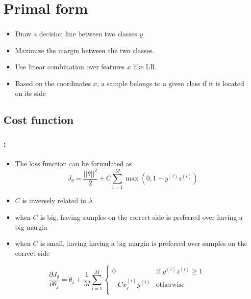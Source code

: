 \documentclass[xcolor=table]{beamer}
\begin{document}
\section{Primal form}

\begin{frame}
	\frametitle{\insertshortsubtitle}
	\framesubtitle{\insertsection}
	
	\begin{minipage}{0.70\textwidth} 
		\begin{itemize}
			\item Draw a decision line between two classes $ y $ 
			\item Maximize the margin between the two classes.
			\item Use linear combination over features $ x $ like LR. 
			\item Based on the coordinates $ x $, a sample belongs to a given class if it is located on its side
		\end{itemize}
	\end{minipage}
	\begin{minipage}{0.29\textwidth} 
	\end{minipage}
	

\end{frame}

\subsection{Cost function}

\begin{frame}
	\frametitle{\insertshortsubtitle: \insertsection}
	\framesubtitle{\insertsubsection}
	
	\begin{itemize}
		\item The loss function can be formulated as 
		\[J_\theta = \frac{||\theta||^2}{2}  +  C \sum_{i=1}^{M} \max (0, 1 - y^{(i)} z^{(i)}) \]
		\item $ C $ is inversely related to $ \lambda $
		\item when $ C $ is big, having samples on the correct side is preferred over having a big margin
		\item when $ C $ is small, having having a big margin is preferred over samples on the correct side
	\end{itemize}
	
	\[\frac{\partial J_\theta}{\partial \theta_{j}} = \theta_j + \frac{1}{M} \sum\limits_{i=1}^{M} \begin{cases}
		0 & \text{if } y^{(i)} z^{(i)} \ge 1\\
		- C x^{(i)}_j y^{(i)} & \text{otherwise}  \\
	\end{cases}\]
	
\end{frame}
\end{document}
